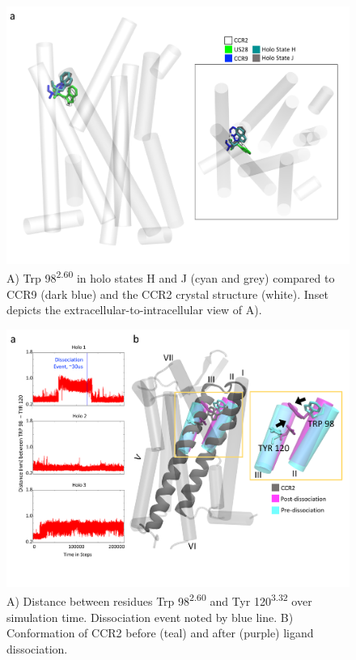 \begin{figure}[htbp]
\begin{center}
\includegraphics[width=\textwidth]{./figures/trp98_ccr9.png}
\caption[Comparison of  across GPCRs]{A) Trp 98\textsuperscript{2.60} in holo states H and J (cyan and grey) compared to CCR9 (dark blue) and the CCR2 crystal structure (white). Inset depicts the extracellular-to-intracellular view of A).}
\label{fig:trp98_ccr9}
\end{center}
\end{figure}


\begin{figure}[htbp]
  \begin{center}
  \includegraphics[width=\textwidth]{./figures/state35_98-120_larger.png}
 \caption[Distance between residues  and ]{A) Distance between residues Trp 98\textsuperscript{2.60} and Tyr 120\textsuperscript{3.32} over simulation time. Dissociation event noted by blue line. B) Conformation of CCR2 before (teal) and after (purple) ligand dissociation.}
  \label{fig:state35_98-120}
\end{center}
\end{figure}

